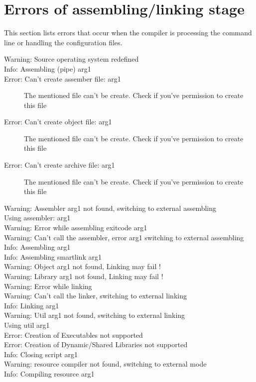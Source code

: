  \section{Errors of assembling/linking stage}
 This section lists errors that occur when the compiler is processing the
 command line or handling the configuration files.
 \begin{description}
\item [Warning: Source operating system redefined]
\item [Info: Assembling (pipe) arg1]
\item [Error: Can't create assember file: arg1]
 The mentioned file can't be create. Check if you've
 permission to create this file
\item [Error: Can't create object file: arg1]
 The mentioned file can't be create. Check if you've
 permission to create this file
\item [Error: Can't create archive file: arg1]
 The mentioned file can't be create. Check if you've
 permission to create this file
\item [Warning: Assembler arg1 not found, switching to external assembling]
\item [Using assembler: arg1]
\item [Warning: Error while assembling exitcode arg1]
\item [Warning: Can't call the assembler, error arg1 switching to external assembling]
\item [Info: Assembling arg1]
\item [Info: Assembling smartlink arg1]
\item [Warning: Object arg1 not found, Linking may fail !]
\item [Warning: Library arg1 not found, Linking may fail !]
\item [Warning: Error while linking]
\item [Warning: Can't call the linker, switching to external linking]
\item [Info: Linking arg1]
\item [Warning: Util arg1 not found, switching to external linking]
\item [Using util arg1]
\item [Error: Creation of Executables not supported]
\item [Error: Creation of Dynamic/Shared Libraries not supported]
\item [Info: Closing script arg1]
\item [Warning: resource compiler not found, switching to external mode]
\item [Info: Compiling resource arg1]
\end{description}

